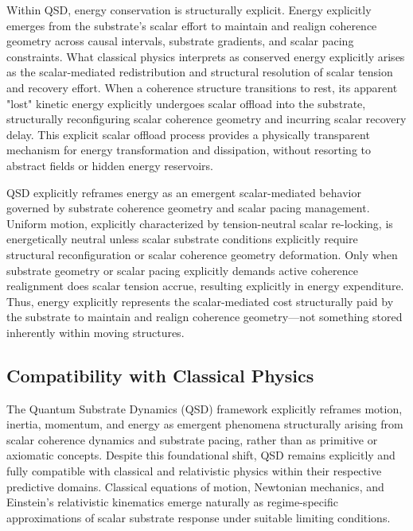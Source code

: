 \documentclass[preprints,article,submit,pdftex,moreauthors]{Definitions/mdpi}
\begin{document}
Within QSD, energy conservation is structurally explicit. Energy explicitly emerges from the substrate's scalar effort to maintain and realign coherence geometry across causal intervals, substrate gradients, and scalar pacing constraints. What classical physics interprets as conserved energy explicitly arises as the scalar-mediated redistribution and structural resolution of scalar tension and recovery effort. When a coherence structure transitions to rest, its apparent "lost" kinetic energy explicitly undergoes scalar offload into the substrate, structurally reconfiguring scalar coherence geometry and incurring scalar recovery delay. This explicit scalar offload process provides a physically transparent mechanism for energy transformation and dissipation, without resorting to abstract fields or hidden energy reservoirs.

QSD explicitly reframes energy as an emergent scalar-mediated behavior governed by substrate coherence geometry and scalar pacing management. Uniform motion, explicitly characterized by tension-neutral scalar re-locking, is energetically neutral unless scalar substrate conditions explicitly require structural reconfiguration or scalar coherence geometry deformation. Only when substrate geometry or scalar pacing explicitly demands active coherence realignment does scalar tension accrue, resulting explicitly in energy expenditure. Thus, energy explicitly represents the scalar-mediated cost structurally paid by the substrate to maintain and realign coherence geometry—not something stored inherently within moving structures.



\subsection{Compatibility with Classical Physics}

The Quantum Substrate Dynamics (QSD) framework explicitly reframes motion, inertia, momentum, and energy as emergent phenomena structurally arising from scalar coherence dynamics and substrate pacing, rather than as primitive or axiomatic concepts. Despite this foundational shift, QSD remains explicitly and fully compatible with classical and relativistic physics within their respective predictive domains. Classical equations of motion, Newtonian mechanics, and Einstein's relativistic kinematics emerge naturally as regime-specific approximations of scalar substrate response under suitable limiting conditions.
\end{document}
